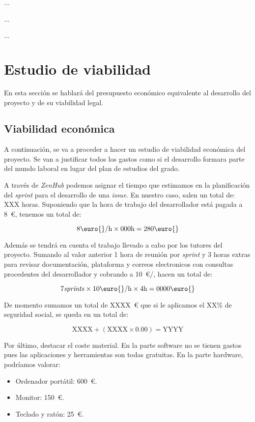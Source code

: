 ...

...

...

\section{Estudio de viabilidad}

En esta sección se hablará del presupuesto económico equivalente al desarrollo del proyecto y de su viabilidad legal.

\subsection{Viabilidad económica}

A continuación, se va a proceder a hacer un estudio de viabilidad económica del proyecto. Se van a justificar todos los gastos como si el desarrollo formara parte del mundo laboral en lugar del plan de estudios del grado.

A través de \textit{ZenHub} podemos asignar el tiempo que estimamos en la planificación del \textit{sprint} para el desarrollo de una \textit{issue}. En nuestro caso, salen un total de: XXX horas. Suponiendo que la hora de trabajo del desarrollador está pagada a 8~\euro{}, tenemos un total de:

\[8\text{\euro{}}/\text{h}\times 000\text{h}=280\text{\euro{}} \]

Además se tendrá en cuenta el trabajo llevado a cabo por los tutores del proyecto. Sumando al valor anterior 1 hora de reunión por \textit{sprint} y 3 horas extras para revisar documentación, plataforma y correos electronicos con consultas procedentes del desarrollador y cobrando a 10~\euro{}/, hacen un total de:

\[7\text{\textit{sprints}}\times 10\text{\euro{}}/\text{h}\times 4\text{\text{h}}=0000\text{\euro{}} \]

De momento sumamos un total de XXXX~\euro{} que si le aplicamos el XX\% de seguridad social, se queda en un total de:

\[\text{XXXX} +  \left( \text{XXXX} \times 0.00 \right) = \text{YYYY} \]

Por último, destacar el coste material. En la parte software no se tienen gastos pues las aplicaciones y herramientas son todas gratuitas. En la parte hardware, podríamos valorar:

\begin{itemize}
	\item Ordenador portátil: 600~\euro{}.
	\item Monitor: 150~\euro{}.
	\item Teclado y ratón: 25~\euro{}.
\end{itemize}

